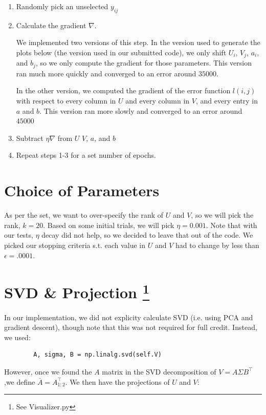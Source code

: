 \documentclass{article}
\begin{document}
\begin{enumerate}
    \item Randomly pick an unselected $y_{ij}$
    \item Calculate the gradient $\nabla$.

    We implemented two versions of this step. In the version used to
    generate the plots below (the version used in our submitted code),
    we only shift $U_i$, $V_j$, $a_i$, and $b_j$, so we only compute the
    gradient for those parameters. This version ran much more quickly and converged
    to an error around $35000$.

    In the other version, we computed
    the gradient of the error function $l(i,j)$ with respect to every
    column in $U$ and every column in $V$, and every entry in $a$ and $b$.
    This version ran more slowly and converged to an error around $45000$

    \item Subtract $\eta \nabla$ from $U$ $V$, $a$, and $b$
    \item Repeat steps 1-3 for a set number of epochs.
\end{enumerate}


\section*{Choice of Parameters}
As per the set, we want to over-specify the rank of $U$ and $V$, so we will
pick the rank, $k = 20$. Based on some initial trials, we will pick $\eta = 0.001$.
Note that with our tests, $\eta$ decay did not help, so we decided to leave that
out of the code. We picked our stopping criteria s.t. each value in $U$ and $V$
had to change by less than $\epsilon = .0001$.

\section*{SVD \& Projection \footnote{See Visualizer.py}}
In our implementation, we did not explicity calculate SVD (i.e. using PCA and
gradient descent), though note that this was not required for full credit.
Instead, we used:

\begin{verbatim}
        A, sigma, B = np.linalg.svd(self.V)
\end{verbatim}

\noindent However, once we found the $A$ matrix in the SVD decomposition of $V = A
\Sigma B^{\intercal}$,we define $\bar{A} = A_{1:2}^{\intercal}$. We then have
the projections of $U$ and $V$:
\end{document}
